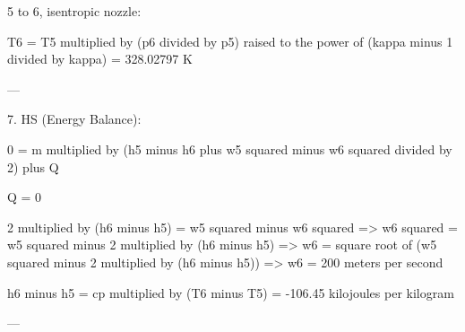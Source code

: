 5 to 6, isentropic nozzle:  

T6 = T5 multiplied by (p6 divided by p5) raised to the power of (kappa minus 1 divided by kappa) = 328.02797 K  

---

7. HS (Energy Balance):  

0 = m multiplied by (h5 minus h6 plus w5 squared minus w6 squared divided by 2) plus Q  

Q = 0  

2 multiplied by (h6 minus h5) = w5 squared minus w6 squared  
=> w6 squared = w5 squared minus 2 multiplied by (h6 minus h5)  
=> w6 = square root of (w5 squared minus 2 multiplied by (h6 minus h5))  
=> w6 = 200 meters per second  

h6 minus h5 = cp multiplied by (T6 minus T5) = -106.45 kilojoules per kilogram  

---